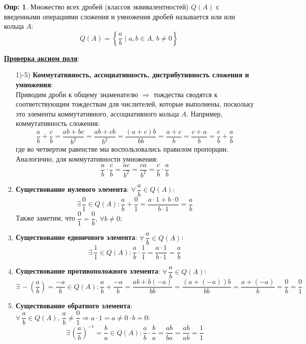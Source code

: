 \documentclass[12pt]{article}
\theoremstyle{definition}
\newtheorem{defn}{Опр:}
\begin{document}
\begin{defn}
	Множество всех дробей (классов эквивалентностей) $Q(A)$ с введенными операциями сложения и умножения дробей называется  или  или  кольца $A$:
	$$
		Q(A) = \left\{\dfrac{a}{b}\mid a,b \in A, \, b \neq 0\right\}
	$$
\end{defn}
\textbf{\uline{Проверка аксиом поля}}:
\begin{enumerate}[label=\arabic*)]
	\item[1)-5)] \textbf{Коммутативность, ассоциативность, дистрибутивность сложения и умножения}: \\
	Приводим дроби к общему знаменателю $\Rightarrow$ тождества сводятся к соответствующим тождествам для числителей, которые выполнены, поскольку это элементы коммутативного, ассоциативного кольца $A$. Например, коммутативность сложения:
	$$
		\dfrac{a}{b} + \dfrac{c}{b} = \dfrac{ab + bc}{b^2} =\dfrac{ab + cb}{b^2} =\dfrac{(a + c)b}{bb} = \dfrac{a + c}{b} = \dfrac{c + a}{b} = \dfrac{c}{b} + \dfrac{a}{b}
	$$
	где во четвертом равенстве мы воспользовались правилом пропорции. Аналогично, для коммутативности умножения:
	$$
		\dfrac{a}{b}{\cdot}\dfrac{c}{b} = \dfrac{ac}{b^2}  = \dfrac{ca}{b^2} = \dfrac{c}{b}{\cdot}\dfrac{a}{b}
	$$
	\setcounter{enumi}{5}
	\item \textbf{Существование нулевого элемента}: $\forall \, \dfrac{a}{b} \in Q(A)$:
	$$
		\exists\, \dfrac{0}{1} \in Q(A) \colon  \dfrac{a}{b} + \dfrac{0}{1} = \dfrac{a{\cdot}1 + b{\cdot}0}{b{\cdot}1} = \dfrac{a}{b}
	$$
	Также заметим, что $\dfrac{0}{1} = \dfrac{0}{b}, \, \forall b \neq 0$;
	\item \textbf{Существование единичного элемента}: $\forall \, \dfrac{a}{b} \in Q(A)$:
	$$
		\exists\, \dfrac{1}{1} \in Q(A) \colon \dfrac{a}{b}{\cdot}\dfrac{1}{1} = \dfrac{a{\cdot}1}{b{\cdot}1} = \dfrac{a}{b}
	$$
	\item \textbf{Существование противоположного элемента}: $\forall \, \dfrac{a}{b} \in Q(A)$:
	$$
		\exists\, -\left(\dfrac{a}{b}\right) = \dfrac{-a}{b} \in Q(A) \colon \dfrac{a}{b} + \dfrac{-a}{b} = \dfrac{ab + b(-a)}{bb} = \dfrac{(a + (-a))b}{bb} = \dfrac{a + (-a)}{b} = \dfrac{0}{b} = \dfrac{0}{1}
	$$
	\item \textbf{Существование обратного элемента}: $\forall \, \dfrac{a}{b} \in Q(A), \, \dfrac{a}{b} \neq \dfrac{0}{1} \Rightarrow a{\cdot}1 = a \neq 0{\cdot}b  = 0$:
	$$
		\exists\, \left(\dfrac{a}{b}\right)^{-1} = \dfrac{b}{a} \in Q(A) \colon \dfrac{a}{b} {\cdot}\dfrac{b}{a} = \dfrac{ab}{ba} = \dfrac{ab}{ab} = \dfrac{1}{1}
	$$
\end{enumerate}
\end{document}
